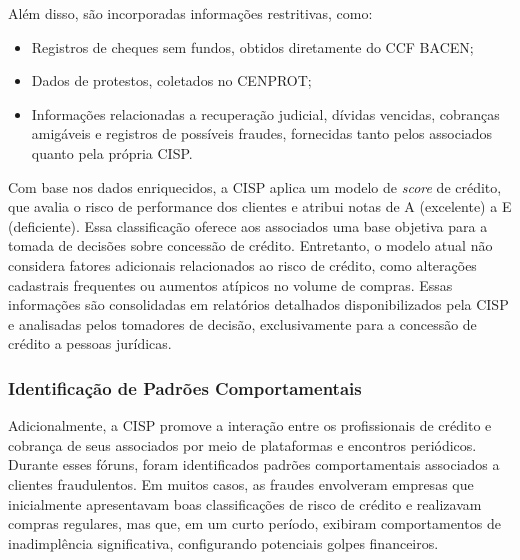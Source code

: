 \documentclass[12pt,a4paper]{article}
\begin{document}
Além disso, são incorporadas informações restritivas, como:
\begin{itemize}
    \item Registros de cheques sem fundos, obtidos diretamente do CCF BACEN;
    \item Dados de protestos, coletados no CENPROT;
    \item Informações relacionadas a recuperação judicial, dívidas vencidas, cobranças amigáveis e registros de possíveis fraudes, fornecidas tanto pelos associados quanto pela própria CISP.
\end{itemize}

Com base nos dados enriquecidos, a CISP aplica um modelo de \textit{score} de crédito, que avalia o risco de performance dos clientes e atribui notas de A (excelente) a E (deficiente). Essa classificação oferece aos associados uma base objetiva para a tomada de decisões sobre concessão de crédito. Entretanto, o modelo atual não considera fatores adicionais relacionados ao risco de crédito, como alterações cadastrais frequentes ou aumentos atípicos no volume de compras. Essas informações são consolidadas em relatórios detalhados disponibilizados pela CISP e analisadas pelos tomadores de decisão, exclusivamente para a concessão de crédito a pessoas jurídicas.

\subsubsection{Identificação de Padrões Comportamentais}

Adicionalmente, a CISP promove a interação entre os profissionais de crédito e cobrança de seus associados por meio de plataformas e encontros periódicos. Durante esses fóruns, foram identificados padrões comportamentais associados a clientes fraudulentos. Em muitos casos, as fraudes envolveram empresas que inicialmente apresentavam boas classificações de risco de crédito e realizavam compras regulares, mas que, em um curto período, exibiram comportamentos de inadimplência significativa, configurando potenciais golpes financeiros.
\end{document}
